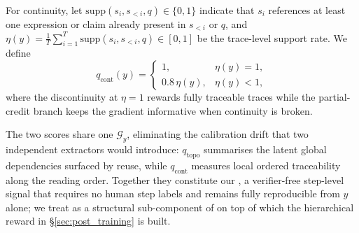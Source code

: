 For continuity, let $\mathrm{supp}(s_i,s_{<i},q)\!\in\!\{0,1\}$ indicate that $s_i$ references at least one expression or claim already present in $s_{<i}$ or $q$, and $\eta(y)\!=\!\tfrac{1}{T}\sum_{i=1}^{T}\mathrm{supp}(s_i,s_{<i},q)\!\in\![0,1]$ be the trace-level support rate. We define
\begin{equation}
\label{eq:qcont}
q_{\mathrm{cont}}(y)=
\begin{cases}
1, & \eta(y)=1,\\
0.8\,\eta(y), & \eta(y)<1,
\end{cases}
\end{equation} %
where the discontinuity at $\eta\!=\!1$ rewards fully traceable traces while the partial-credit branch keeps the gradient informative when continuity is broken.

The two scores share one $\mathcal{G}_y$, eliminating the calibration drift that two independent extractors would introduce: $q_{\mathrm{topo}}$ summarises the latent global dependencies surfaced by reuse, while $q_{\mathrm{cont}}$ measures local ordered traceability along the reading order. Together they constitute our \prm, a verifier-free step-level signal that requires no human step labels and remains fully reproducible from $y$ alone; we treat \prm as a structural sub-component of \method on top of which the hierarchical reward in \S\ref{sec:post_training} is built.


